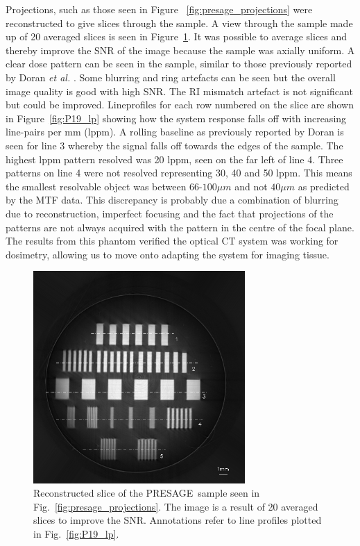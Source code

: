 Projections, such as those seen in Figure ~\ref{fig:presage_projections} were reconstructed to give slices through the sample. A view through the sample made up of 20 averaged slices is seen in Figure~\ref{fig:presage_slice}. It was possible to average slices and thereby improve the SNR of the image because the sample was axially uniform. A clear dose pattern can be seen in the sample, similar to those previously reported by Doran \textit{et al.} \cite{doranestablishing2013}. Some blurring and ring artefacts can be seen but the overall  image quality is good with high SNR. The RI mismatch artefact is not significant but could be improved. Lineprofiles for each row numbered on the slice are shown in Figure~\ref{fig:P19_lp} showing how the system response falls off with increasing line-pairs per mm (lppm).  A rolling baseline as previously reported by Doran is seen for line 3 whereby the signal falls off towards the edges of the sample.  The highest lppm pattern resolved was 20 lppm, seen  on the far left of line 4. Three patterns on line 4 were not resolved representing 30, 40 and 50 lppm. This means the smallest resolvable object was between 66-$100\mu m$ and not  $40\mu m$ as predicted by the MTF data. This discrepancy is probably due a combination of blurring due to reconstruction, imperfect focusing and the fact that projections of the patterns are not always acquired with the pattern in the centre of the focal plane.  
The results from this phantom verified the optical CT system was working for dosimetry, allowing us to move onto adapting the system for imaging tissue. 



	\begin{figure}[H]
		\centering
		\includegraphics[width=0.72\textwidth]{meth_img/P19_recon370-399av_lineprofiles.png}
		\caption{Reconstructed slice of the PRESAGE\texttrademark ~sample seen in Fig.~\ref{fig:presage_projections}. The image is a result of 20 averaged slices to improve the SNR. Annotations refer to line profiles plotted in Fig.~\ref{fig:P19_lp}. }
		\label{fig:presage_slice}
	\end{figure}
	

